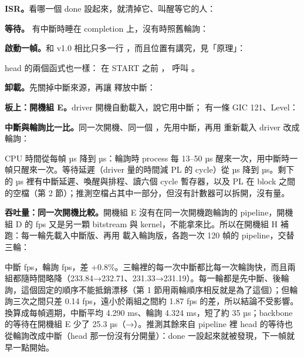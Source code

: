 \textbf{ISR。}看哪一個 done 設起來，就清掉它、叫醒等它的人：


\textbf{等待。} 有中斷時睡在 completion 上，沒有時照舊輪詢：


\textbf{啟動一幀。}和 v1.0 相比只多一行 ，而且位置有講究，見「原理」：


head 的兩個函式也一樣： 在 START 之前 ， 呼叫 。

\textbf{卸載。}先關掉中斷來源，再讓  釋放中斷：


\textbf{板上：開機組 E。}driver 開機自動載入，說它用中斷； 有一條 GIC 121、Level：


\textbf{中斷與輪詢比一比。}同一次開機、同一個 ，先用中斷，再用  重新載入 driver 改成輪詢：


CPU 時間從每幀 \pollCpuUs{} µs 降到 \irqCpuUs{} µs：輪詢時 process 每 13--50 µs 醒來一次，用中斷時一幀只醒來一次。等待延遲（driver 量的時間減 PL 的 cycle）從 \pollWaitUs{} µs 降到 \irqWaitUs{} µs。剩下的 \irqWaitUs{} µs 裡有中斷延遲、喚醒與排程、讀六個 cycle 暫存器，以及 PL 在 block 之間的空檔（第 2 節）；推測空檔占其中一部分，但沒有計數器可以拆開，沒有量。

\textbf{吞吐量：同一次開機比較。}開機組 E 沒有在同一次開機跑輪詢的 pipeline，開機組 D 的 \abDrvNc{} fps 又是另一顆 bitstream 與 kernel，不能拿來比。所以在開機組 H 補跑：每一輪先載入中斷版、再用  載入輪詢版，各跑一次 120 幀的 pipeline，交替三輪：


中斷 \hIrqFps{} fps，輪詢 \hPollFps{} fps，差 +0.8\%。三輪裡的每一次中斷都比每一次輪詢快，而且兩組都隨時間略降（233.84→232.71、231.33→231.19）。每一輪都是先中斷、後輪詢，這個固定的順序不能抵銷漂移（第 1 節用兩輪順序相反就是為了這個）；但輪詢三次之間只差 0.14 fps，遠小於兩組之間約 1.87 fps 的差，所以結論不受影響。換算成每幀週期，中斷平均 4.290 ms、輪詢 4.324 ms，短了約 35 µs；backbone 的等待在開機組 E 少了 25.3 µs（\pollWaitUs{}→\irqWaitUs{}）。推測其餘來自 pipeline 裡 head 的等待也從輪詢改成中斷（head 那一份沒有分開量）：done 一設起來就被發現，下一幀就早一點開始。

